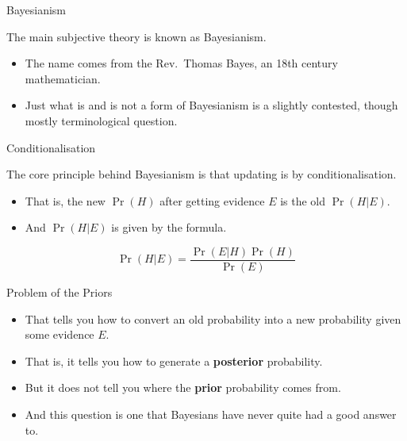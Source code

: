 \documentclass[
  ignorenonframetext,
]{beamer}
\providecommand{\tightlist}{%
  \setlength{\itemsep}{0pt}\setlength{\parskip}{0pt}}
\renewcommand{\,}{\text{, }}
\begin{document}
\begin{frame}{Bayesianism}
\protect\hypertarget{bayesianism-1}{}

The main subjective theory is known as Bayesianism.

\begin{itemize}
\tightlist
\item
  The name comes from the Rev.~Thomas Bayes, an 18th century
  mathematician.
\item
  Just what is and is not a form of Bayesianism is a slightly contested,
  though mostly terminological question.
\end{itemize}

\end{frame}

\begin{frame}{Conditionalisation}
\protect\hypertarget{conditionalisation-1}{}

The core principle behind Bayesianism is that updating is by
conditionalisation.

\begin{itemize}
\tightlist
\item
  That is, the new \(\Pr(H)\) after getting evidence \(E\) is the old
  \(\Pr(H | E)\).
\item
  And \(\Pr(H | E)\) is given by the formula.
\end{itemize}

\[
\Pr(H | E) = \frac{\Pr(E | H)\Pr(H)}{\Pr(E)}
\]

\end{frame}

\begin{frame}{Problem of the Priors}
\protect\hypertarget{problem-of-the-priors-1}{}

\begin{itemize}
\tightlist
\item
  That tells you how to convert an old probability into a new
  probability given some evidence \(E\).
\item
  That is, it tells you how to generate a \textbf{posterior}
  probability. \pause
\item
  But it does not tell you where the \textbf{prior} probability comes
  from.
\item
  And this question is one that Bayesians have never quite had a good
  answer to.
\end{itemize}

\end{frame}
\end{document}
